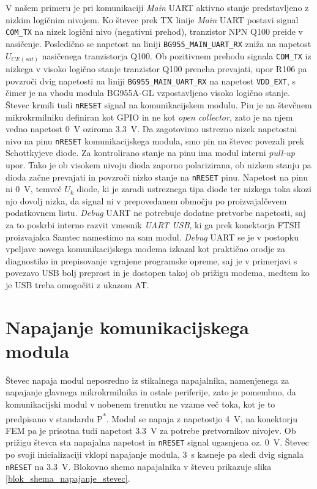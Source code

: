 \documentclass[a4paper,twoside,openright,12pt,slovene]{book}
\begin{document}
V našem primeru je pri komunikaciji \textit{Main} UART aktivno stanje predstavljeno z nizkim logičnim nivojem. Ko števec prek TX linije \textit{Main} UART postavi signal \texttt{COM\_TX} na nizek logični nivo (negativni prehod), tranzistor NPN Q100 preide v nasičenje. Posledično se napetost na liniji \texttt{BG955\_MAIN\_UART\_RX} zniža na napetost $U_{CE(sat)}$ nasičenega tranzistorja Q100. Ob pozitivnem prehodu signala \texttt{COM\_TX} iz nizkega v visoko logično stanje tranzistor Q100 preneha prevajati, upor R106 pa povzroči dvig napetosti na liniji \texttt{BG955\_MAIN\_UART\_RX} na napetost \texttt{VDD\_EXT}, s čimer je na vhodu modula BG955A-GL vzpostavljeno visoko logično stanje. 
Števec krmili tudi \texttt{nRESET} signal na komunikacijskem modulu. Pin je na števčnem mikrokrmilniku definiran kot GPIO in ne kot \textit{open collector}, zato je na njem vedno napetost \SI{0}{\volt} oziroma \SI{3,3}{\volt}. Da zagotovimo ustrezno nizek napetostni nivo na pinu \texttt{nRESET} komunikacijskega modula, smo pin na števec povezali prek Schottkyjeve diode. Za kontrolirano stanje na pinu ima modul interni \textit{pull-up} upor. Tako je ob visokem nivoju dioda zaporno polarizirana, ob nizkem stanju pa dioda začne prevajati in povzroči nizko stanje na \texttt{nRESET} pinu. Napetost na pinu ni \SI{0}{\volt}, temveč $U_{k}$ diode, ki je zaradi ustreznega tipa diode ter nizkega toka skozi njo dovolj nizka, da signal ni v prepovedanem območju po proizvajalčevem podatkovnem listu. \textit{Debug} UART ne potrebuje dodatne pretvorbe napetosti, saj za to poskrbi interno razvit vmesnik \textit{UART USB}, ki ga prek konektorja FTSH proizvajalca Samtec namestimo na sam modul. \textit{Debug} UART se je v postopku vpeljave novega komunikacijskega modema izkazal kot praktično orodje za diagnostiko in prepisovanje vgrajene programske opreme, saj je v primerjavi s povezavo USB bolj preprost in je dostopen takoj ob prižigu modema, medtem ko je USB treba omogočiti z ukazom AT. 

\section{Napajanje komunikacijskega modula}
Števec napaja modul neposredno iz stikalnega napajalnika, namenjenega za napajanje glavnega mikrokrmilnika in ostale periferije, zato je pomembno, da komunikacijski modul v nobenem trenutku ne vzame več toka, kot je to predpisano v standardu P\textsuperscript{*}. Modul se napaja z napetostjo \SI{4}{\volt}, na konektorju FEM pa je prisotna tudi napetost \SI{3,3}{\volt} za potrebe pretvornikov nivojev. Ob prižigu števca sta napajalna napetost in \texttt{nRESET} signal ugasnjena oz. \SI{0}{\volt}. Števec po svoji inicializaciji vklopi napajanje modula, \SI{3}{\second} kasneje pa sledi dvig signala \texttt{nRESET} na \SI{3,3}{\volt}. Blokovno shemo napajalnika v števcu prikazuje slika \ref{blok_shema_napajanje_stevec}. 
 
\end{document}
